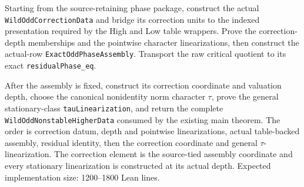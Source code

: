 \begin{theorem}
\label{mod:cases-wildodd-correctionpreparation}
Starting from the source-retaining phase package, construct the actual
\texttt{WildOddCorrectionData} and bridge its correction units to the indexed
presentation required by the High and Low table wrappers.  Prove the
correction-depth memberships and the pointwise character linearizations, then
construct the actual-row \texttt{ExactOddPhaseAssembly}.  Transport the raw
critical quotient to its exact \texttt{residualPhase\_eq}.

After the assembly is fixed, construct its correction coordinate and
valuation depth, choose the canonical nonidentity norm character $\tau$, prove
the general stationary-class \texttt{tauLinearization}, and return the complete
\texttt{WildOddNonstableHigherData} consumed by the existing main theorem.
\leanok
{}
\FormalizationContract
The order is correction datum, depth and pointwise linearizations, actual
table-backed assembly, residual identity, then the correction coordinate and
general $\tau$-linearization.  The correction element is the source-tied
assembly coordinate and every stationary linearization is constructed at its
actual depth.  Expected implementation size: 1200--1800 Lean lines.
\end{theorem}
